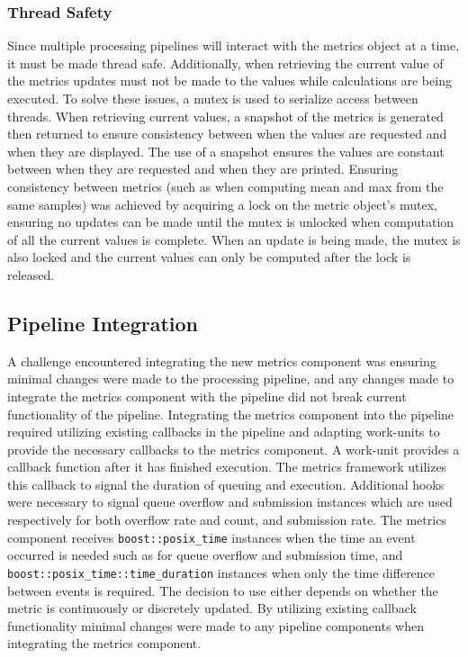 \subsubsection{Thread Safety}
Since multiple processing \gls{pipeline}s will interact with the metrics object at a
time, it must be made thread safe. Additionally, when retrieving the current
value of the metrics updates must not be made to the values while calculations
are being executed. To solve these issues, a \gls{mutex} is used to serialize
access between threads. When retrieving current values, a snapshot of the
metrics is generated then returned to ensure consistency between when the values
are requested and when they are displayed. The use of a snapshot ensures the
values are constant between when they are requested and when they are printed.
Ensuring consistency between metrics (such as when computing mean and max from
the same samples) was achieved by acquiring a lock on the metric object's mutex,
ensuring no updates can be made until the \gls{mutex} is unlocked when
computation of all the current values is complete. When an update is being made,
the mutex is also locked and the current values can only be computed after the
lock is released.

\subsection{Pipeline Integration}

A challenge encountered integrating the new metrics component was ensuring
minimal changes were made to the processing \gls{pipeline}, and any changes made
to integrate the metrics component with the \gls{pipeline} did not break current
functionality of the \gls{pipeline}. Integrating the metrics component into the
\gls{pipeline} required utilizing existing callbacks in the \gls{pipeline} and
adapting \glspl{work-unit} to provide the necessary callbacks to the metrics
component. A \gls{work-unit} provides a callback function after it has finished
execution. The metrics framework utilizes this callback to signal the duration
of queuing and execution. Additional hooks were necessary to signal queue
overflow and submission instances which are used respectively for both overflow
rate and count, and submission rate.  The metrics component receives
\lstinline|boost::posix_time| \glspl{instance} when the time an event occurred
is needed such as for queue overflow and submission time, and
\lstinline|boost::posix_time::time_duration| \glspl{instance} when only the time
difference between events is required. The decision to use either depends on
whether the metric is continuously or discretely updated. By utilizing existing
callback functionality minimal changes were made to any \gls{pipeline}
components when integrating the metrics component.
